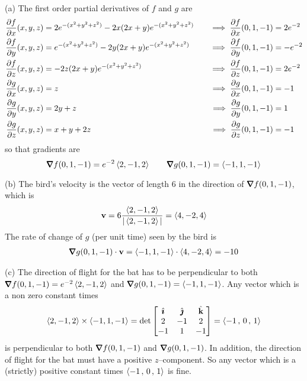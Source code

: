 \begin{solution}
(a) The first order partial derivatives of $f$ and $g$ are
\begin{alignat*}{3}
\pdiff{f}{x}(x,y,z)&=  2e^{-(x^2 +y^2 +z^2)} -2x(2x + y)e^{-(x^2 +y^2 +z^2)}
&\quad\implies \pdiff{f}{x}(0,1,-1)&=2e^{-2} \\
\pdiff{f}{y}(x,y,z)&=  e^{-(x^2 +y^2 +z^2)} -2y(2x + y)e^{-(x^2 +y^2 +z^2)}
&\quad\implies \pdiff{f}{y}(0,1,-1)&=-e^{-2} \\
\pdiff{f}{z}(x,y,z)&=  -2z(2x + y)e^{-(x^2 +y^2 +z^2)}
&\quad\implies \pdiff{f}{z}(0,1,-1)&=2e^{-2} 
\\
\pdiff{g}{x}(x,y,z)&=  z
&\quad\implies \pdiff{g}{x}(0,1,-1)&=-1 \\
\pdiff{g}{y}(x,y,z)&=  2y+z
&\quad\implies \pdiff{g}{y}(0,1,-1)&= 1 \\
\pdiff{g}{z}(x,y,z)&=  x+y+2z
&\quad\implies \pdiff{g}{z}(0,1,-1)&=-1
\end{alignat*}
so that gradients are
\begin{equation*}
\vnabla f(0,1,-1) =e^{-2}\llt 2,-1,2\rgt\qquad
\vnabla g(0,1,-1) =\llt -1,1,-1\rgt
\end{equation*}

(b) The bird's velocity is the vector of length $6$ in the direction of
$\vnabla f(0,1,-1)$, which is
\begin{equation*}
\mathbf{v}= 6\frac{\left< 2,-1,2\right>}{|\left< 2,-1,2\right>|}
=\left< 4,-2,4\right>
\end{equation*}
The rate of change of $g$ (per unit time) seen by the bird is
\begin{align*}
\vnabla g(0,1,-1) \cdot \vv
=\llt -1,1,-1\rgt \cdot \llt 4,-2,4\rgt
= -10
\end{align*}

(c) The direction of flight for the bat has to be perpendicular to both
$\vnabla f(0,1,-1) =e^{-2}\llt 2,-1,2\rgt$ and 
$\vnabla g(0,1,-1) =\llt -1,1,-1\rgt$. Any vector which is a non zero constant
times
\begin{align*}
\left< 2,-1,2\right> \times \left< -1,1,-1\right>
    =\det\left[\begin{matrix}
            \hat{\pmb{\imath}}  &  \hat{\pmb{\jmath}}  &  \hat{\mathbf{k}} \\
             2   &  -1   &   2 \\
            -1   &   1   &  -1 
            \end{matrix}\right]
=\left< -1 \,,\, 0 \,,\, 1 \right>
\end{align*}
is perpendicular to both $\vnabla f(0,1,-1)$ and 
$\vnabla g(0,1,-1)$. In addition, the direction of flight for the bat
must have a positive $z$--component. So any vector which is a (strictly)
positive constant times $\left< -1 \,,\, 0 \,,\, 1 \right>$ is fine.
\end{solution}

